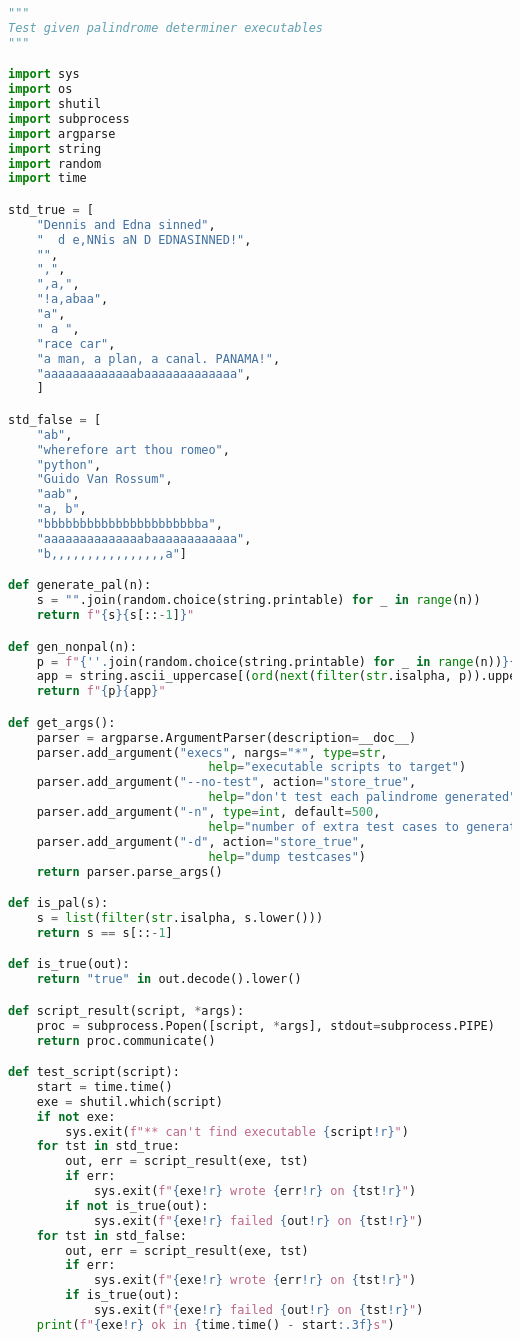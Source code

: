 \documentclass{article}
\begin{document}
\begin{lstlisting}[language=Python, caption=Testing script]
"""
Test given palindrome determiner executables
"""

import sys
import os
import shutil
import subprocess
import argparse
import string
import random
import time

std_true = [
    "Dennis and Edna sinned",
    "  d e,NNis aN D EDNASINNED!",
    "",
    ",",
    ",a,",
    "!a,abaa",
    "a",
    " a ",
    "race car",
    "a man, a plan, a canal. PANAMA!",
    "aaaaaaaaaaaaabaaaaaaaaaaaaa",
    ]

std_false = [
    "ab",
    "wherefore art thou romeo",
    "python",
    "Guido Van Rossum",
    "aab",
    "a, b",
    "bbbbbbbbbbbbbbbbbbbbbba",
    "aaaaaaaaaaaaaabaaaaaaaaaaaa",
    "b,,,,,,,,,,,,,,,,a"]

def generate_pal(n):
    s = "".join(random.choice(string.printable) for _ in range(n))
    return f"{s}{s[::-1]}"

def gen_nonpal(n):
    p = f"{''.join(random.choice(string.printable) for _ in range(n))}{random.choice(string.ascii_letters)}"
    app = string.ascii_uppercase[(ord(next(filter(str.isalpha, p)).upper()) - 65 + 13) % 26]
    return f"{p}{app}"

def get_args():
    parser = argparse.ArgumentParser(description=__doc__)
    parser.add_argument("execs", nargs="*", type=str,
                            help="executable scripts to target")
    parser.add_argument("--no-test", action="store_true",
                            help="don't test each palindrome generated")
    parser.add_argument("-n", type=int, default=500,
                            help="number of extra test cases to generate for both true and false")
    parser.add_argument("-d", action="store_true",
                            help="dump testcases")
    return parser.parse_args() 

def is_pal(s):
    s = list(filter(str.isalpha, s.lower()))
    return s == s[::-1]

def is_true(out):
    return "true" in out.decode().lower()

def script_result(script, *args):
    proc = subprocess.Popen([script, *args], stdout=subprocess.PIPE)
    return proc.communicate()

def test_script(script):
    start = time.time()
    exe = shutil.which(script)
    if not exe:
        sys.exit(f"** can't find executable {script!r}")
    for tst in std_true:
        out, err = script_result(exe, tst)
        if err:
            sys.exit(f"{exe!r} wrote {err!r} on {tst!r}")
        if not is_true(out):
            sys.exit(f"{exe!r} failed {out!r} on {tst!r}")
    for tst in std_false:
        out, err = script_result(exe, tst)
        if err:
            sys.exit(f"{exe!r} wrote {err!r} on {tst!r}")
        if is_true(out):
            sys.exit(f"{exe!r} failed {out!r} on {tst!r}")
    print(f"{exe!r} ok in {time.time() - start:.3f}s")


\end{lstlisting}
\end{document}
